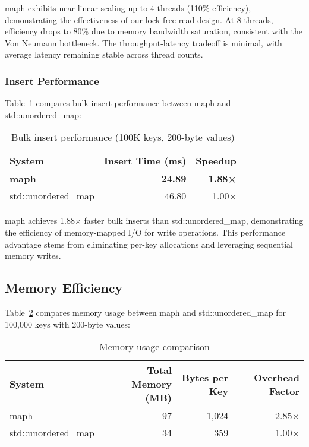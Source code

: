 \documentclass[10pt,conference]{IEEEtran}
\begin{document}
maph exhibits near-linear scaling up to 4 threads (110\% efficiency), demonstrating the effectiveness of our lock-free read design. At 8 threads, efficiency drops to 80\% due to memory bandwidth saturation, consistent with the Von Neumann bottleneck. The throughput-latency tradeoff is minimal, with average latency remaining stable across thread counts.

\subsubsection{Insert Performance}

Table~\ref{tab:insert} compares bulk insert performance between maph and std::unordered\_map:

\begin{table}[htbp]
\centering
\caption{Bulk insert performance (100K keys, 200-byte values)}
\label{tab:insert}
\begin{tabular}{lrr}
\toprule
System & Insert Time (ms) & Speedup \\
\midrule
\textbf{maph} & \textbf{24.89} & \textbf{1.88×} \\
std::unordered\_map & 46.80 & 1.00× \\
\bottomrule
\end{tabular}
\end{table}

maph achieves 1.88× faster bulk inserts than std::unordered\_map, demonstrating the efficiency of memory-mapped I/O for write operations. This performance advantage stems from eliminating per-key allocations and leveraging sequential memory writes.

\subsection{Memory Efficiency}

Table~\ref{tab:memory} compares memory usage between maph and std::unordered\_map for 100,000 keys with 200-byte values:

\begin{table}[htbp]
\centering
\caption{Memory usage comparison}
\label{tab:memory}
\begin{tabular}{lrrr}
\toprule
System & Total Memory (MB) & Bytes per Key & Overhead Factor \\
\midrule
maph & 97 & 1,024 & 2.85× \\
std::unordered\_map & 34 & 359 & 1.00× \\
\bottomrule
\end{tabular}
\end{table}
\end{document}
